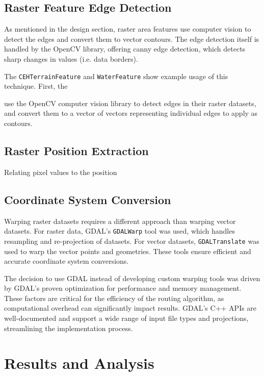 \documentclass[12pt]{article}
\begin{document}
\subsection{Raster Feature Edge Detection}

As mentioned in the design section, raster area features use computer vision to detect the edges and convert them to vector contours. The edge detection itself is handled by the OpenCV library, offering canny edge detection, which detects sharp changes in values (i.e. data borders).

The \texttt{CEHTerrainFeature} and \texttt{WaterFeature} show example usage of this technique. First, the


use the OpenCV computer vision library to detect edges in their raster datasets, and convert them to a vector of vectors representing individual edges to apply as contours.

\subsection{Raster Position Extraction}

Relating pixel values to the position


\subsection{Coordinate System Conversion}

Warping raster datasets requires a different approach than warping vector datasets. For raster data, GDAL's \texttt{GDALWarp} tool was used, which handles resampling and re-projection of datasets. For vector datasets, \texttt{GDALTranslate} was used to warp the vector points and geometries. These tools ensure efficient and accurate coordinate system conversions.

The decision to use GDAL instead of developing custom warping tools was driven by GDAL's proven optimization for performance and memory management. These factors are critical for the efficiency of the routing algorithm, as computational overhead can significantly impact results. GDAL's C++ APIs are well-documented and support a wide range of input file types and projections, streamlining the implementation process.

\section{Results and Analysis}
\end{document}
